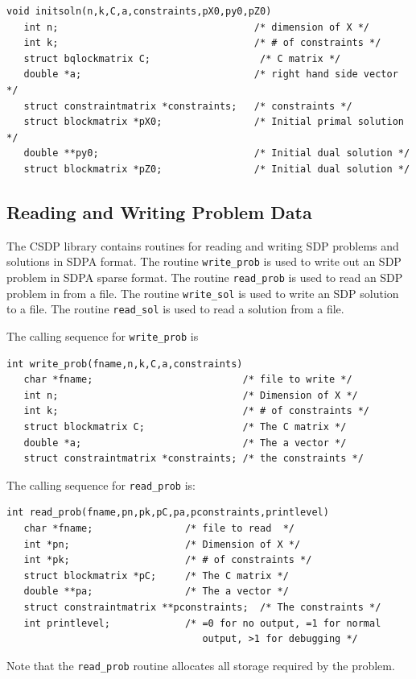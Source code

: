 \documentclass{article}
\begin{document}
\begin{verbatim}
void initsoln(n,k,C,a,constraints,pX0,py0,pZ0)
   int n;                                  /* dimension of X */
   int k;                                  /* # of constraints */
   struct bqlockmatrix C;                   /* C matrix */
   double *a;                              /* right hand side vector */
   struct constraintmatrix *constraints;   /* constraints */
   struct blockmatrix *pX0;                /* Initial primal solution */
   double **py0;                           /* Initial dual solution */
   struct blockmatrix *pZ0;                /* Initial dual solution */
\end{verbatim}


\subsection*{Reading and Writing Problem Data}
The CSDP library contains routines for reading and writing SDP
problems and solutions in SDPA format. The routine {\tt write\_prob}
is used to write out an SDP problem in SDPA sparse format.  The
routine {\tt read\_prob} is used to read an SDP problem in from a
file.  The routine {\tt write\_sol} is used to write an SDP solution
to a file.  The routine {\tt read\_sol} is used to read a solution
from a file.

The calling sequence for {\tt write\_prob} is 

\begin{verbatim}
int write_prob(fname,n,k,C,a,constraints)
   char *fname;                          /* file to write */
   int n;                                /* Dimension of X */
   int k;                                /* # of constraints */
   struct blockmatrix C;                 /* The C matrix */
   double *a;                            /* The a vector */
   struct constraintmatrix *constraints; /* the constraints */
\end{verbatim}

The calling sequence for {\tt read\_prob} is:

\begin{verbatim} 
int read_prob(fname,pn,pk,pC,pa,pconstraints,printlevel)
   char *fname;                /* file to read  */
   int *pn;                    /* Dimension of X */
   int *pk;                    /* # of constraints */
   struct blockmatrix *pC;     /* The C matrix */
   double **pa;                /* The a vector */
   struct constraintmatrix **pconstraints;  /* The constraints */
   int printlevel;             /* =0 for no output, =1 for normal
                                  output, >1 for debugging */
\end{verbatim}
Note that the {\tt read\_prob} routine allocates all storage required
by the problem.  
 
\end{document}
